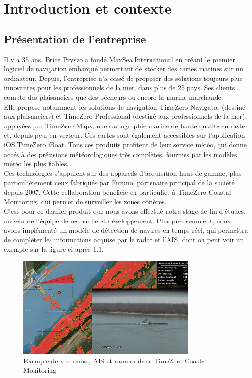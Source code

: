 \chapter{Introduction et contexte}


\section{Présentation de l'entreprise}

Il y a 35 ans, Brice Pryszo a fondé MaxSea International en créant le premier logiciel de navigation embarqué
permettant de stocker des cartes marines sur un ordinateur. Depuis, l'entreprise n'a cessé de proposer
des solutions toujours plus innovantes pour les professionnels de la mer, dans plus de 25 pays.
Ses clients compte des plaisanciers que des pêcheurs ou encore la marine marchande. \\
Elle propose notamment les solutions de navigation TimeZero Navigator (destiné aux plaisanciers)
et TimeZero Professional (destiné aux professionnels de la mer), appuyées par TimeZero Maps,
une cartographie marine de haute qualité en raster et, depuis peu, en vecteur.
Ces cartes sont également accessibles sur l'application iOS TimeZero iBoat.
Tous ces produits profitent de leur service météo, qui donne accés à des précisions
météorologiques très complètes, fournies par les modèles météo les plus fiables.\\

Ces technologies s'appuient sur des appareils d'acquisition haut de gamme, plus particulièrement
ceux fabriqués par Furuno, partenaire principal de la société depuis 2007. Cette collaboration
bénéficie en particulier à TimeZero Coastal Monitoring, qui permet de surveiller les zones côtières. \\

C'est pour ce dernier produit que nous avons effectué notre stage de fin d'études, au sein de l'équipe
de recherche et développement. Plus précisemment, nous avons implémenté un modèle
de détection de navires en temps réel, qui permettra de compléter les informations acquise par le radar
et l'AIS, dont on peut voir un exemple sur la figure ci-après \ref{fig:radar}.

\begin{figure}[H]
    \centering
    \includegraphics[width=0.8\textwidth]{./img/ports-harbors-cameras1.jpg}
    \caption{Exemple de vue radar, AIS et camera dans TimeZero Coastal Monitoring}
    \label{fig:radar}
\end{figure}

